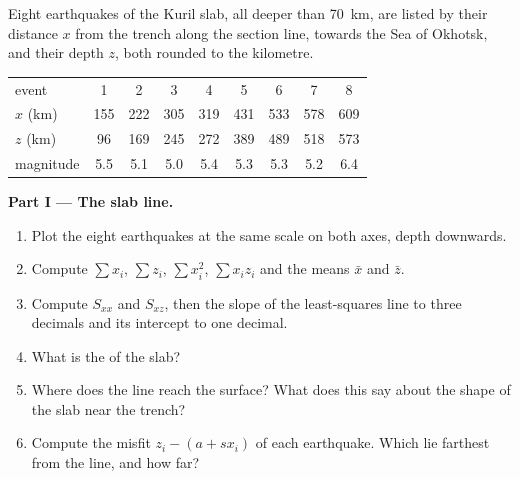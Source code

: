 \begin{problem}
\label{pb:b1:active-margins:1}
Eight earthquakes of the Kuril slab, all deeper than \qty{70}{km}, are listed
by their distance $x$ from the trench along the section line, towards the Sea
of Okhotsk, and their depth $z$, both rounded to the kilometre.

\begin{center}
\small
\begin{tabular}{lcccccccc}
\hline
event & 1 & 2 & 3 & 4 & 5 & 6 & 7 & 8\\
$x$ (\unit{km}) & 155 & 222 & 305 & 319 & 431 & 533 & 578 & 609\\
$z$ (\unit{km}) & 96 & 169 & 245 & 272 & 389 & 489 & 518 & 573\\
magnitude & 5.5 & 5.1 & 5.0 & 5.4 & 5.3 & 5.3 & 5.2 & 6.4\\
\hline
\end{tabular}
\end{center}

\medskip
\noindent\textbf{Part I --- The slab line.}
\begin{enumerate}
  \item Plot the eight earthquakes at the same scale on both axes, depth
        downwards.
  \item Compute $\sum x_i$, $\sum z_i$, $\sum x_i^2$, $\sum x_i z_i$ and the
        means $\bar x$ and $\bar z$.
  \item Compute $S_{xx}$ and $S_{xz}$, then the slope of the least-squares line
        to three decimals and its intercept to one decimal.
  \item What is the  of the slab?
  \item Where does the line reach the surface? What does this say about the
        shape of the slab near the trench?
  \item Compute the misfit $z_i - (a + s x_i)$ of each earthquake. Which lie
        farthest from the line, and how far?
\end{enumerate}


\end{problem}
